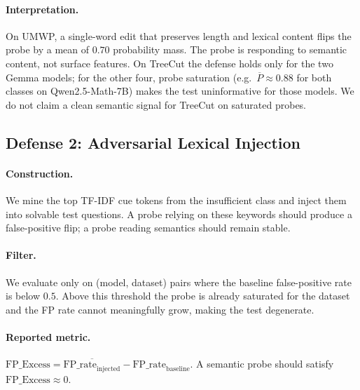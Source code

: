 \paragraph{Interpretation.}
On UMWP, a single-word edit that preserves length and lexical content
flips the probe by a mean of $0.70$ probability mass. The probe is
responding to semantic content, not surface features. On TreeCut the
defense holds only for the two Gemma models; for the other four,
probe saturation (e.g.\ $\overline{P} \approx 0.88$ for both classes on
Qwen2.5-Math-7B) makes the test uninformative for those models. We do
not claim a clean semantic signal for TreeCut on saturated probes.

\subsection{Defense 2: Adversarial Lexical Injection}
\label{sec:d2}

\paragraph{Construction.}
We mine the top TF-IDF cue tokens from the insufficient class and
inject them into solvable test questions. A probe relying on these
keywords should produce a false-positive flip; a probe reading
semantics should remain stable.

\paragraph{Filter.}
We evaluate only on (model, dataset) pairs where the baseline
false-positive rate is below $0.5$. Above this threshold the probe is
already saturated for the dataset and the FP rate cannot meaningfully
grow, making the test degenerate.

\paragraph{Reported metric.}
$\mathrm{FP\_Excess} = \overline{\mathrm{FP\_rate}_{\text{injected}}}
- \mathrm{FP\_rate}_{\text{baseline}}$.
A semantic probe should satisfy $\mathrm{FP\_Excess} \approx 0$.

